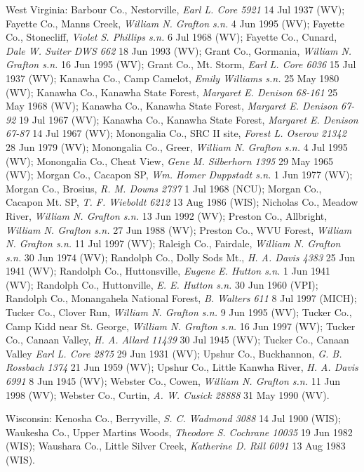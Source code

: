 \documentclass{article}
\begin{document}
West Virginia:
Barbour Co., Nestorville, \textit{Earl L. Core 5921} 14 Jul 1937 (WV);
Fayette Co., Manns Creek, \textit{William N. Grafton s.n.} 4 Jun 1995 (WV);
Fayette Co., Stonecliff, \textit{Violet S. Phillips s.n.} 6 Jul 1968 (WV);
Fayette Co., Cunard, \textit{Dale W. Suiter DWS 662} 18 Jun 1993 (WV);
Grant Co., Gormania, \textit{William N. Grafton s.n.} 16 Jun 1995 (WV);
Grant Co., Mt. Storm, \textit{Earl L. Core 6036} 15 Jul 1937 (WV);
Kanawha Co., Camp Camelot, \textit{Emily Williams s.n.} 25 May 1980 (WV);
Kanawha Co., Kanawha State Forest, \textit{Margaret E. Denison 68-161} 25 May 1968 (WV);
Kanawha Co., Kanawha State Forest, \textit{Margaret E. Denison 67-92} 19 Jul 1967 (WV);
Kanawha Co., Kanawha State Forest, \textit{Margaret E. Denison 67-87} 14 Jul 1967 (WV);
Monongalia Co., SRC II site, \textit{Forest L. Oserow 21342} 28 Jun 1979 (WV);
Monongalia Co., Greer, \textit{William N. Grafton s.n.} 4 Jul 1995 (WV);
Monongalia Co., Cheat View, \textit{Gene M. Silberhorn 1395} 29 May 1965 (WV);
Morgan Co., Cacapon SP, \textit{Wm. Homer Duppstadt s.n.} 1 Jun 1977 (WV);
Morgan Co., Brosius, \textit{R. M. Downs 2737} 1 Jul 1968 (NCU);
Morgan Co., Cacapon Mt. SP, \textit{T. F. Wieboldt 6212} 13 Aug 1986 (WIS);
Nicholas Co., Meadow River, \textit{William N. Grafton s.n.} 13 Jun 1992 (WV);
Preston Co., Allbright, \textit{William N. Grafton s.n.} 27 Jun 1988 (WV);
Preston Co., WVU Forest, \textit{William N. Grafton s.n.} 11 Jul 1997 (WV);
Raleigh Co., Fairdale, \textit{William N. Grafton s.n.} 30 Jun 1974 (WV);
Randolph Co., Dolly Sods Mt., \textit{H. A. Davis 4383} 25 Jun 1941 (WV);
Randolph Co., Huttonsville, \textit{Eugene E. Hutton s.n.} 1 Jun 1941 (WV);
Randolph Co., Huttonville, \textit{E. E. Hutton s.n.} 30 Jun 1960 (VPI);
Randolph Co., Monangahela National Forest, \textit{B. Walters 611} 8 Jul 1997 (MICH);
Tucker Co., Clover Run, \textit{William N. Grafton s.n.} 9 Jun 1995 (WV);
Tucker Co., Camp Kidd near St. George, \textit{William N. Grafton s.n.} 16 Jun 1997 (WV);
Tucker Co., Canaan Valley, \textit{H. A. Allard 11439} 30 Jul 1945 (WV);
Tucker Co., Canaan Valley \textit{Earl L. Core 2875} 29 Jun 1931 (WV);
Upshur Co., Buckhannon, \textit{G. B. Rossbach 1374} 21 Jun 1959 (WV);
Upshur Co., Little Kanwha River, \textit{H. A. Davis 6991} 8 Jun 1945 (WV);
Webster Co., Cowen, \textit{William N. Grafton s.n.} 11 Jun 1998 (WV);
Webster Co., Curtin, \textit{A. W. Cusick 28888} 31 May 1990 (WV).

Wisconsin:
Kenosha Co., Berryville, \textit{S. C. Wadmond 3088} 14 Jul 1900 (WIS);
Waukesha Co., Upper Martins Woods, \textit{Theodore S. Cochrane 10035} 19 Jun 1982 (WIS);
Waushara Co., Little Silver Creek, \textit{Katherine D. Rill 6091} 13 Aug 1983 (WIS).
\end{document}
